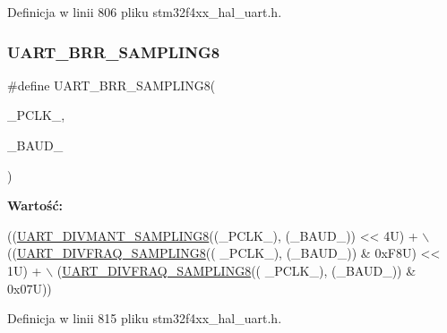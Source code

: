 Definicja w linii 806 pliku stm32f4xx\+\_\+hal\+\_\+uart.\+h.

\mbox{\label{group___u_a_r_t___private___macros_gae36ed9e94681494a31a9d8a7bbcc1a2c}} 
\subsubsection{\texorpdfstring{U\+A\+R\+T\+\_\+\+B\+R\+R\+\_\+\+S\+A\+M\+P\+L\+I\+N\+G8}{UART\_BRR\_SAMPLING8}}
{\footnotesize\ttfamily \#define U\+A\+R\+T\+\_\+\+B\+R\+R\+\_\+\+S\+A\+M\+P\+L\+I\+N\+G8(\begin{DoxyParamCaption}\item[{}]{\+\_\+\+P\+C\+L\+K\+\_\+,  }\item[{}]{\+\_\+\+B\+A\+U\+D\+\_\+ }\end{DoxyParamCaption})}

{\bfseries Wartość\+:}
\begin{DoxyCode}
((\hyperlink{group___u_a_r_t___private___macros_ga3dafeed17fc4cf319b0dd88d7d0fb614}{UART\_DIVMANT\_SAMPLING8}((\_PCLK\_), (\_BAUD\_)) << 4U) + \(\backslash\)
                                                        ((\hyperlink{group___u_a_r_t___private___macros_gae0c8a28dbc006a93dd8e90e8ff8a37a0}{UART\_DIVFRAQ\_SAMPLING8}((
      \_PCLK\_), (\_BAUD\_)) & 0xF8U) << 1U) + \(\backslash\)
                                                        (\hyperlink{group___u_a_r_t___private___macros_gae0c8a28dbc006a93dd8e90e8ff8a37a0}{UART\_DIVFRAQ\_SAMPLING8}((
      \_PCLK\_), (\_BAUD\_)) & 0x07U))
\end{DoxyCode}


Definicja w linii 815 pliku stm32f4xx\+\_\+hal\+\_\+uart.\+h.

\mbox{\label{group___u_a_r_t___private___macros_gabd6dd99fff6cd5c0374780fd72a61e6e}} 
